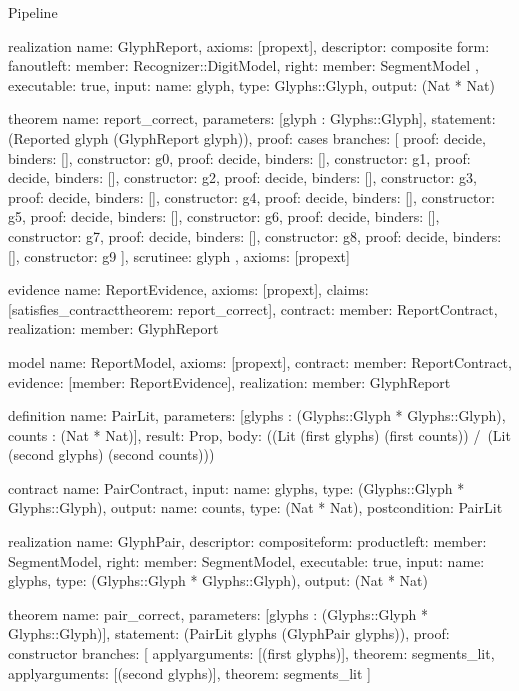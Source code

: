 \begin{lexlean}{Pipeline}
\begin{semanticmodule}
realization{
  name: GlyphReport,
  axioms: [propext],
  descriptor: composite{
    form: fanout{left: {member: Recognizer::DigitModel}, right: {member: SegmentModel}}
  },
  executable: true,
  input: {name: glyph, type: Glyphs::Glyph},
  output: (Nat * Nat)
}

theorem{
  name: report_correct,
  parameters: [glyph : Glyphs::Glyph],
  statement: (Reported glyph (GlyphReport glyph)),
  proof: cases{
    branches: [
      {proof: decide{}, binders: [], constructor: g0},
      {proof: decide{}, binders: [], constructor: g1},
      {proof: decide{}, binders: [], constructor: g2},
      {proof: decide{}, binders: [], constructor: g3},
      {proof: decide{}, binders: [], constructor: g4},
      {proof: decide{}, binders: [], constructor: g5},
      {proof: decide{}, binders: [], constructor: g6},
      {proof: decide{}, binders: [], constructor: g7},
      {proof: decide{}, binders: [], constructor: g8},
      {proof: decide{}, binders: [], constructor: g9}
    ],
    scrutinee: glyph
  },
  axioms: [propext]
}

evidence{
  name: ReportEvidence,
  axioms: [propext],
  claims: [satisfies_contract{theorem: report_correct}],
  contract: {member: ReportContract},
  realization: {member: GlyphReport}
}

model{
  name: ReportModel,
  axioms: [propext],
  contract: {member: ReportContract},
  evidence: [{member: ReportEvidence}],
  realization: {member: GlyphReport}
}

definition{
  name: PairLit,
  parameters: [glyphs : (Glyphs::Glyph * Glyphs::Glyph), counts : (Nat * Nat)],
  result: Prop,
  body: ((Lit (first glyphs) (first counts)) /\ (Lit (second glyphs) (second counts)))
}

contract{
  name: PairContract,
  input: {name: glyphs, type: (Glyphs::Glyph * Glyphs::Glyph)},
  output: {name: counts, type: (Nat * Nat)},
  postcondition: PairLit
}

realization{
  name: GlyphPair,
  descriptor: composite{form: product{left: {member: SegmentModel}, right: {member: SegmentModel}}},
  executable: true,
  input: {name: glyphs, type: (Glyphs::Glyph * Glyphs::Glyph)},
  output: (Nat * Nat)
}

theorem{
  name: pair_correct,
  parameters: [glyphs : (Glyphs::Glyph * Glyphs::Glyph)],
  statement: (PairLit glyphs (GlyphPair glyphs)),
  proof: constructor{
    branches: [
      apply{arguments: [(first glyphs)], theorem: segments_lit},
      apply{arguments: [(second glyphs)], theorem: segments_lit}
    ]
  }
}


\end{semanticmodule}
\end{lexlean}
